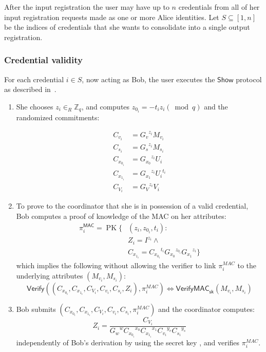 \documentclass{article}
\begin{document}
After the input registration the user may have up to $n$ credentials from all of her input registration requests made as one or more Alice identities.
Let $S \subseteq \left[1,n\right]$ be the indices of credentials that she wants to consolidate into a single output registration.

\subsubsection{Credential validity}

For each credential $i \in S$, now acting as Bob, the user executes the $\mathsf{Show}$ protocol as described in~\cite{chase2019signal}.

\begin{enumerate}

\item She chooses
$z_i \in_{R} \mathbb{Z}_{q}$,
and computes 
$z_{0_i}=-{t_i} {z_i} (\bmod q)$
and the randomized commitments:

\begin{align*}
C_{v_i}     &= {G_v}^{z_i} M_{v_i} \\
C_{s_i}     &= {G_s}^{z_i} M_{s_i} \\
C_{x_{0_i}} &= {G_{x_0}}^{z_i} {U_i} \\
C_{x_{1_i}} &= {G_{x_1}}^{z_i} {U_i}^{t_i} \\
C_{V_i}     &= {G_V}^{z_i} V_i
\end{align*}

\item To prove to the coordinator that she is in possession of a valid credential, Bob computes a proof of knowledge of the MAC on her attributes:
\begin{align*}
\pi_{i}^{\mathsf{MAC}}=\operatorname{PK}\{
& (z_i, z_{0_i},t_i): \\
& Z_i =I^{z_i} \land \\ %
& C_{x_{1_i}} = {C_{x_{0_i}}}^{t_i} {G_{x_0}}^{z_{0_i}} {G_{x_1}}^{z_i}\}
\end{align*}
which implies the following without allowing the verifier to link $\pi_{i}^\mathit{MAC}$ to the underlying attributes $(M_{v_i}, M_{s_i})$:
\[
\mathsf{Verify}((C_{x_{0_i}}, C_{x_{1_i}}, C_{V_i}, C_{v_i}, C_{s_i}, Z_i), \pi_i^{\mathit{MAC}}) \iff \mathsf{VerifyMAC}_{\mathsf{sk}}(M_{v_i}, M_{s_i})
\]


\item Bob submits $(C_{x_{0_i}}, C_{x_{1_i}}, C_{V_i}, C_{v_i}, C_{s_i}, \pi_i^{\mathit{MAC}})$ and the coordinator computes:
\[
Z_i=\frac{C_{V_i}}{{G_w}^w {C_{x_{0_i}}}^{x_0} {C_{x_{1_i}}}^{x_{1}}
{C_{v_i}}^{y_v} {C_{s_i}}^{y_s}
}
\]
independently of Bob's derivation by using the secret key , and verifies $\pi_i^{\mathit{MAC}}$.

\end{enumerate}
\end{document}
